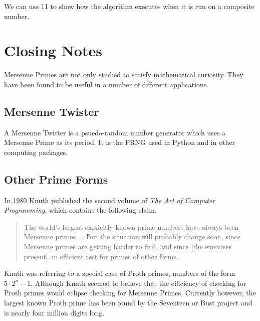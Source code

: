 We can use 11 to show how the algorithm executes when it is run on a composite number.


\section{Closing Notes}

Mersenne Primes are not only studied to satisfy mathematical curiosity.  They have been found to be useful in a number of different applications.  

\subsection{Mersenne Twister}
A Mersenne Twister is a psuedo-random number generator which uses a Mersenne Prime as
its period. It is the PRNG used in Python and in other computing packages.
\subsection{Other Prime Forms}
\label{sec:knuth}
In 1980 Knuth published the second volume of \emph{The Art of Computer Programming}, which contains the following claim.

\begin{quote}
The world’s largest explicitly known prime numbers have always been Mersenne primes ... But the situation will probably change soon, since Mersenne primes are getting harder to find, and since [the exercises present] an efficient test for primes of other forms. \cite{taocp}
\end{quote}

Knuth was referring to a special case of Proth primes, numbers of the form $5\cdot2^n-1$.
Although Knuth seemed to believe that the efficiency of checking for Proth primes would
eclipse checking for Mersenne Primes. Currently however, the largest known Proth prime has
been found by the Seventeen or Bust project and is nearly four million digits long.~\cite{seventeenorbust}

